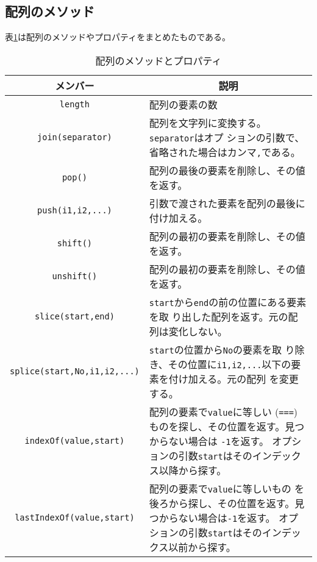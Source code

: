 \subsection{配列のメソッド}
表\ref{arrayPropMethod}は配列のメソッドやプロパティをまとめたものである。
\begin{table}[ht]
\caption{配列のメソッドとプロパティ}\label{arrayPropMethod}
 \begin{tabular}{|c|m{}|}\hline
 メンバー&\multicolumn{1}{c|}{説明} \\\hline
  \Verb+length+ &配列の要素の数\\ \hline
  \Verb+join(separator)+& 配列を文字列に変換する。\Verb+separator+はオプ
      ションの引数で、省略された場合はカンマ\Verb+,+である。\\ \hline
  \Verb+pop()+& 配列の最後の要素を削除し、その値を返す。
      \\ \hline
  \Verb+push(i1,i2,...)+& 引数で渡された要素を配列の最後に付け加える。
      \\ \hline
  \Verb+shift()+&配列の最初の要素を削除し、その値を返す。
      \\ \hline
  \Verb+unshift()+&配列の最初の要素を削除し、その値を返す。
      \\ \hline
  \Verb+slice(start,end)+&\Verb+start+から\Verb+end+の前の位置にある要素を取
      り出した配列を返す。元の配列は変化しない。\\ \hline
  \Verb+splice(start,No,i1,i2,...)+&\Verb+start+の位置から\Verb+No+の要素を取
      り除き、その位置に\Verb+i1,i2,...+以下の要素を付け加える。元の配列
      を変更する。\\ \hline
  \Verb+indexOf(value,start)+&配列の要素で\texttt{value}に等しい
      (\texttt{===})ものを探し、その位置を返す。見つからない場合は
      \texttt{-1}を返す。
      オプションの引数\texttt{start}はそのインデックス以降から探す。
      \\ \hline
  \Verb+lastIndexOf(value,start)+&配列の要素で\texttt{value}に等しいもの
      を後ろから探し、その位置を返す。見つからない場合は\texttt{-1}を返す。
      オプションの引数\texttt{start}はそのインデックス以前から探す。
      \\ \hline
\end{tabular}
\end{table}

